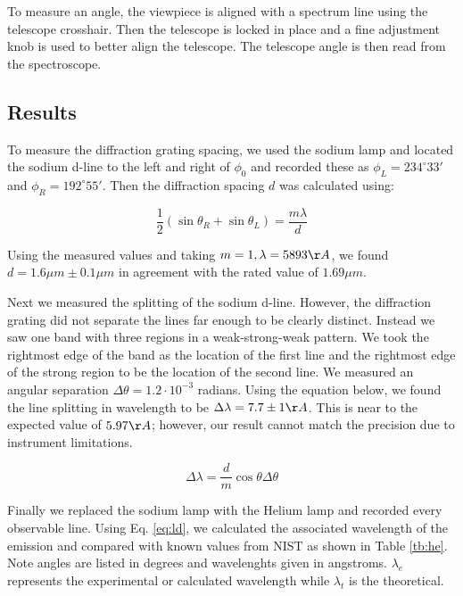 \documentclass[12pt,twocolumn]{article}
\begin{document}
To measure an angle, the viewpiece is aligned with a spectrum line using the telescope crosshair. Then the telescope is locked in place and a fine adjustment knob is used to better align the telescope. The telescope angle is then read from the spectroscope.

\subsection{Results}

To measure the diffraction grating spacing, we used the sodium lamp and located the sodium d-line to the left and right of $\phi_{0}$ and recorded these as $\phi_{L}=234^{\circ}33'$ and $\phi_{R}=192^{\circ}55'$. Then the diffraction spacing $d$ was calculated using:

\begin{equation}
	\label{eq:ld}
	\frac{1}{2}\left(\sin\theta_{R}+\sin\theta_{L}\right)=\frac{m\lambda}{d}
\end{equation}

Using the measured values and taking $m=1, \lambda=5893\AA$, we found $d=1.6\mu m\pm 0.1\mu m$ in agreement with the rated value of $1.69\mu m$.

Next we measured the splitting of the sodium d-line. However, the diffraction grating did not separate the lines far enough to be clearly distinct. Instead we saw one band with three regions in a weak-strong-weak pattern. We took the rightmost edge of the band as the location of the first line and the rightmost edge of the strong region to be the location of the second line. We measured an angular separation $\Delta\theta=1.2\cdot10^{-3}$ radians. Using the equation below, we found the line splitting in wavelength to be $\Delta\lambda=7.7\pm1\AA$. This is near to the expected value of $5.97\AA$; however, our result cannot match the precision due to instrument limitations.

\begin{equation}
	\Delta\lambda=\frac{d}{m}\cos\theta \Delta\theta
\end{equation}

Finally we replaced the sodium lamp with the Helium lamp and recorded every observable line. Using Eq. \ref{eq:ld}, we calculated the associated wavelength of the emission and compared with known values from NIST\cite{NIST} as shown in Table \ref{tb:he}. Note angles are listed in degrees and wavelenghts given in angstroms. $\lambda_{e}$ represents the experimental or calculated wavelength while $\lambda_{t}$ is the theoretical.
\end{document}
